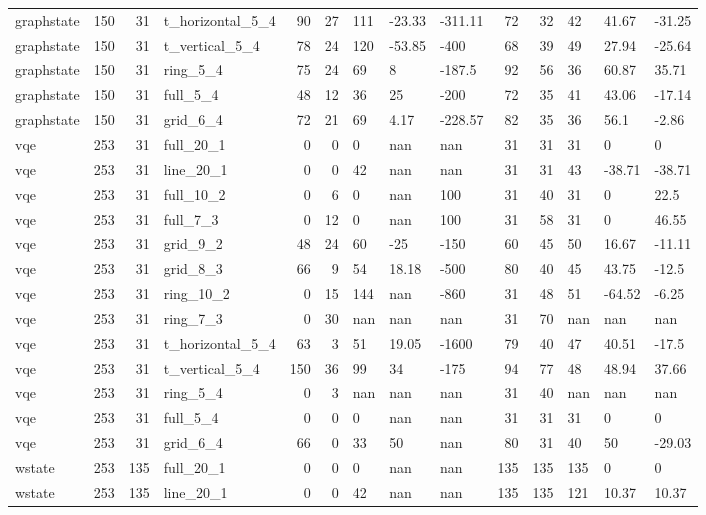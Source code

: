 \begin{longtable}{lrrlrrlllrrlll}
graphstate & 150 & 31 & t\_horizontal\_5\_4 & 90 & 27 & 111 & -23.33 & -311.11 & 72 & 32 & 42 & 41.67 & -31.25 \\
graphstate & 150 & 31 & t\_vertical\_5\_4 & 78 & 24 & 120 & -53.85 & -400 & 68 & 39 & 49 & 27.94 & -25.64 \\
graphstate & 150 & 31 & ring\_5\_4 & 75 & 24 & 69 & 8 & -187.5 & 92 & 56 & 36 & 60.87 & 35.71 \\
graphstate & 150 & 31 & full\_5\_4 & 48 & 12 & 36 & 25 & -200 & 72 & 35 & 41 & 43.06 & -17.14 \\
graphstate & 150 & 31 & grid\_6\_4 & 72 & 21 & 69 & 4.17 & -228.57 & 82 & 35 & 36 & 56.1 & -2.86 \\
vqe & 253 & 31 & full\_20\_1 & 0 & 0 & 0 & nan & nan & 31 & 31 & 31 & 0 & 0 \\
vqe & 253 & 31 & line\_20\_1 & 0 & 0 & 42 & nan & nan & 31 & 31 & 43 & -38.71 & -38.71 \\
vqe & 253 & 31 & full\_10\_2 & 0 & 6 & 0 & nan & 100 & 31 & 40 & 31 & 0 & 22.5 \\
vqe & 253 & 31 & full\_7\_3 & 0 & 12 & 0 & nan & 100 & 31 & 58 & 31 & 0 & 46.55 \\
vqe & 253 & 31 & grid\_9\_2 & 48 & 24 & 60 & -25 & -150 & 60 & 45 & 50 & 16.67 & -11.11 \\
vqe & 253 & 31 & grid\_8\_3 & 66 & 9 & 54 & 18.18 & -500 & 80 & 40 & 45 & 43.75 & -12.5 \\
vqe & 253 & 31 & ring\_10\_2 & 0 & 15 & 144 & nan & -860 & 31 & 48 & 51 & -64.52 & -6.25 \\
vqe & 253 & 31 & ring\_7\_3 & 0 & 30 & nan & nan & nan & 31 & 70 & nan & nan & nan \\
vqe & 253 & 31 & t\_horizontal\_5\_4 & 63 & 3 & 51 & 19.05 & -1600 & 79 & 40 & 47 & 40.51 & -17.5 \\
vqe & 253 & 31 & t\_vertical\_5\_4 & 150 & 36 & 99 & 34 & -175 & 94 & 77 & 48 & 48.94 & 37.66 \\
vqe & 253 & 31 & ring\_5\_4 & 0 & 3 & nan & nan & nan & 31 & 40 & nan & nan & nan \\
vqe & 253 & 31 & full\_5\_4 & 0 & 0 & 0 & nan & nan & 31 & 31 & 31 & 0 & 0 \\
vqe & 253 & 31 & grid\_6\_4 & 66 & 0 & 33 & 50 & nan & 80 & 31 & 40 & 50 & -29.03 \\
wstate & 253 & 135 & full\_20\_1 & 0 & 0 & 0 & nan & nan & 135 & 135 & 135 & 0 & 0 \\
wstate & 253 & 135 & line\_20\_1 & 0 & 0 & 42 & nan & nan & 135 & 135 & 121 & 10.37 & 10.37 \\

\end{longtable}
